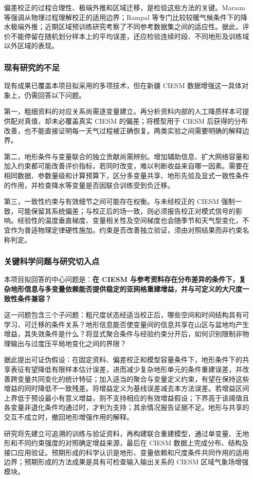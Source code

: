 偏差校正的过程合理性、极端外推和区域迁移，是检验这些方法的关键。Maraun 等强调从物理过程理解校正的适用边界\cite{Maraun2017}；Rampal 等专门比较较暖气候条件下的降水极端外推\cite{Rampal2024}；近期区域预训练研究考察了不同参考数据集之间的适应性\cite{Pretrain2026}。据此，评价不能停留在随机划分样本上的平均误差，还应检验连续时段、不同地形及训练域以外区域的表现。

\subsubsection{现有研究的不足}

现有成果已覆盖本项目拟采用的多项技术，但在新疆 CIESM 数据增强这一具体对象上，仍需回答以下问题。

第一，粗细资料的对应关系尚需逐变量建立。再分析资料内部的人工降质样本可提供配对真值，却未必覆盖真实 CIESM 的偏差；将模型用于 CIESM 后获得的分布改善，也不能直接证明每一天气过程被正确恢复。两类实验之间需要明确的解释边界。

第二，地形条件与变量联合的独立贡献尚需辨别。增加辅助信息、扩大网络容量和加入约束都可能改善评价指标，若同时改变，难以判断收益来自哪一因素。需要在相同数据、参数量级和计算预算下，区分多变量共享、地形先验及显式一致性条件的作用，并检查降水等变量是否因联合训练受到负迁移。

第三，一致性约束与有效细节之间可能存在权衡。与未经校正的 CIESM 强制一致，可能保留其系统偏差；与校正后的场一致，则必须报告校正对模式信号的影响。经验性的温度垂直梯度、变量相关性及空间梯度也会随季节和天气型变化，不宜作为普适物理定律硬性施加。约束是否改善独立验证，须由对照结果而非约束名称判定。

\subsubsection{关键科学问题与研究切入点}

本项目拟回答的中心问题是：\textbf{在 CIESM 与参考资料存在分布差异的条件下，复杂地形信息与多变量依赖能否提供稳定的亚网格重建增益，并与可定义的大尺度一致性条件兼容？}

这一问题包含三个子问题：粗尺度状态经适当校正后，哪些空间和时间结构具有可学习、可迁移的条件关系？地形信息能否使变量间的信息共享在山区与盆地均产生增益，其失效条件是什么？将显式聚合条件与经验约束分开后，如何识别限制非物理输出与过度压平局地变化之间的界限？

据此提出可证伪假设：在固定资料、偏差校正和模型容量条件下，地形条件下的共享表征有望降低有限样本估计误差，进而减少复杂地形单元的条件重建误差，并改善跨变量共同变化的统计特征；加入适当的聚合与变量定义约束，有望在保持这些增益的同时降低不一致残差。将增益定义为基线误差减去本方法误差。若增益区间上界低于预设最小有意义增益，则不支持相应的有效增益假设；下界高于该阈值且各变量非退化条件均通过时，才判为支持；其余情况报告证据不足。地形与共享的交互不成立时，撤回地形增强作用的解释。

研究将先建立可追溯的训练与验证资料，再构建联合重建模型，通过单变量、无地形和不同约束强度的对照确定增益来源，最后在 CIESM 数据上完成分布、结构及接口应用验证。预期形成的科学认识是地形、变量依赖和尺度条件共同作用的适用边界；预期形成的方法成果是具有可检查输入输出关系的 CIESM 区域气象场增强模块。
